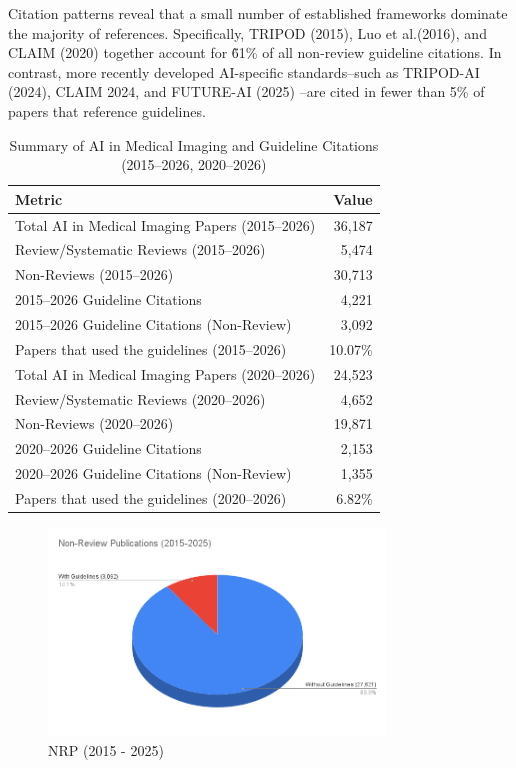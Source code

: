 \documentclass{article}
\begin{document}
Citation patterns reveal that a small number of established frameworks dominate the majority of references. Specifically, TRIPOD (2015), Luo et al.(2016), and CLAIM (2020) together account for \~61\% of all non-review guideline citations. In contrast, more recently developed AI-specific standards–such as TRIPOD-AI (2024), CLAIM 2024, and FUTURE-AI (2025) –are cited in fewer than 5\% of papers that reference guidelines.

\newpage

\begin{table}[htbp]
\centering
\caption{Summary of AI in Medical Imaging and Guideline Citations (2015–2026, 2020–2026)}
\begin{tabular}{l r}
\hline
\textbf{Metric} & \textbf{Value} \\
\hline
Total AI in Medical Imaging Papers (2015–2026) & 36,187 \\
Review/Systematic Reviews (2015–2026) & 5,474 \\
Non-Reviews (2015–2026) & 30,713 \\
2015–2026 Guideline Citations & 4,221 \\
2015–2026 Guideline Citations (Non-Review) & 3,092 \\
Papers that used the guidelines (2015–2026) & 10.07\% \\
\hline
Total AI in Medical Imaging Papers (2020–2026) & 24,523 \\
Review/Systematic Reviews (2020–2026) & 4,652 \\
Non-Reviews (2020–2026) & 19,871 \\
2020–2026 Guideline Citations & 2,153 \\
2020–2026 Guideline Citations (Non-Review) & 1,355 \\
Papers that used the guidelines (2020–2026) & 6.82\% \\
\hline
\end{tabular}
\end{table}

\begin{figure}[htbp]
    \centering
    \includegraphics[width=0.8\textwidth]{Non-Review Publications (2015-2025).png}
    \caption{NRP (2015 - 2025)}
    \label{fig:nrp2015}
\end{figure}
\end{document}
